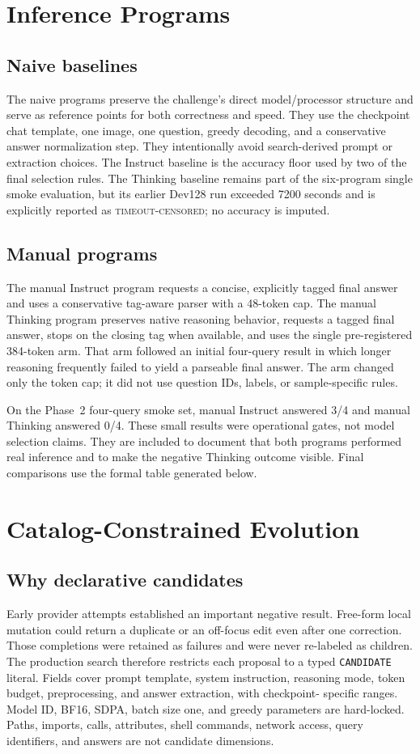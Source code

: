 \documentclass{article}
\begin{document}
\section{Inference Programs}
\subsection{Naive baselines}
The naive programs preserve the challenge's direct model/processor structure and
serve as reference points for both correctness and speed. They use the checkpoint
chat template, one image, one question, greedy decoding, and a conservative answer
normalization step. They intentionally avoid search-derived prompt or extraction
choices. The Instruct baseline is the accuracy floor used by two of the final
selection rules. The Thinking baseline remains part of the six-program single
smoke evaluation, but its earlier Dev128 run exceeded 7200 seconds and is explicitly
reported as \textsc{timeout-censored}; no accuracy is imputed.

\subsection{Manual programs}
The manual Instruct program requests a concise, explicitly tagged final answer and
uses a conservative tag-aware parser with a 48-token cap. The manual Thinking
program preserves native reasoning behavior, requests a tagged final answer,
stops on the closing tag when available, and uses the single pre-registered
384-token arm. That arm followed an initial four-query result in which longer
reasoning frequently failed to yield a parseable final answer. The arm changed
only the token cap; it did not use question IDs, labels, or sample-specific rules.

On the Phase~2 four-query smoke set, manual Instruct answered 3/4 and manual
Thinking answered 0/4. These small results were operational gates, not model
selection claims. They are included to document that both programs performed
real inference and to make the negative Thinking outcome visible. Final
comparisons use the formal table generated below.

\section{Catalog-Constrained Evolution}
\subsection{Why declarative candidates}
Early provider attempts established an important negative result. Free-form local
mutation could return a duplicate or an off-focus edit even after one correction.
Those completions were retained as failures and were never re-labeled as children.
The production search therefore restricts each proposal to a typed
\texttt{CANDIDATE} literal. Fields cover prompt template, system instruction,
reasoning mode, token budget, preprocessing, and answer extraction, with checkpoint-
specific ranges. Model ID, BF16, SDPA, batch size one, and greedy parameters are
hard-locked. Paths, imports, calls, attributes, shell commands, network access,
query identifiers, and answers are not candidate dimensions.
\end{document}

